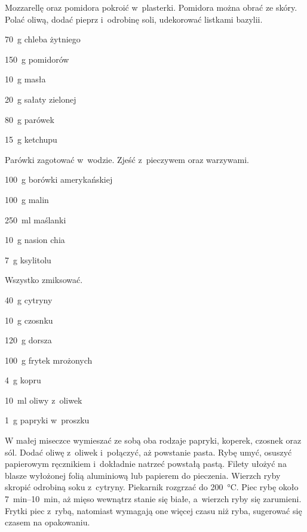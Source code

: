 \documentclass[../main.tex]{subfiles}
\begin{document}
Mozzarellę oraz pomidora pokroić w~plasterki. Pomidora można obrać ze skóry.
Polać oliwą, dodać pieprz i~odrobinę soli, udekorować listkami bazylii.


\begin{Ingred}
    \item \qty{70}{\gram} chleba żytniego
    \item \qty{150}{\gram} pomidorów
    \item \qty{10}{\gram} masła
    \item \qty{20}{\gram} sałaty zielonej
    \item \qty{80}{\gram} parówek
    \item \qty{15}{\gram} ketchupu
\end{Ingred}

Parówki zagotować w~wodzie. Zjeść z~pieczywem oraz warzywami.


\begin{Ingred}
    \item \qty{100}{\gram} borówki amerykańskiej
    \item \qty{100}{\gram} malin
    \item \qty{250}{\milli\litre} maślanki
    \item \qty{10}{\gram} nasion chia
    \item \qty{7}{\gram} ksylitolu
\end{Ingred}

Wszystko zmiksować.


\begin{Ingred}
    \item \qty{40}{\gram} cytryny
    \item \qty{10}{\gram} czosnku
    \item \qty{120}{\gram} dorsza
    \item \qty{100}{\gram} frytek mrożonych
    \item \qty{4}{\gram} kopru
    \item \qty{10}{\milli\litre} oliwy z~oliwek
    \item \qty{1}{\gram} papryki w~proszku
\end{Ingred}

W małej miseczce wymieszać ze sobą oba rodzaje papryki, koperek, czosnek oraz
sól. Dodać oliwę z~oliwek i~połączyć, aż powstanie pasta. Rybę umyć, osuszyć
papierowym ręcznikiem i~dokładnie natrzeć powstałą pastą. Filety ułożyć na
blasze wyłożonej folią aluminiową lub papierem do pieczenia. Wierzch ryby
skropić odrobiną soku z~cytryny. Piekarnik rozgrzać do \qty{200}{\celsius}.
Piec rybę około \qtyrange{7}{10}{\minute}, aż mięso wewnątrz stanie się białe,
a~wierzch ryby się zarumieni. Frytki piec z~rybą, natomiast wymagają one więcej
czasu niż ryba, sugerować się czasem na opakowaniu.
\end{document}
